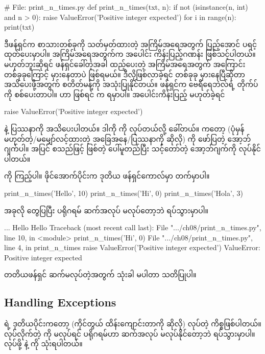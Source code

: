 %
\begin{py}
# File: print_n_times.py
def print_n_times(txt, n):
    if not (isinstance(n, int) and n > 0):
        raise ValueError('Positive integer expected')
    for i in range(n):
        print(txt)
\end{py}
%
ဒီဖန်ရှင်က စာသားတစ်ခုကို သတ်မှတ်ထားတဲ့ အကြိမ်အရေအတွက် ပြည့်အောင် ပရင့်ထုတ်ပေးမှာပါ။ အကြိမ်အရေအတွက်က အပေါင်း ကိန်းပြည့်ဂဏန်း ဖြစ်သင့်ပါတယ်။ မဟုတ်ဘူးဆိုရင် ဖန်ရှင်ခေါ်တဲ့အခါ ထည့်ပေးတဲ့ အကြိမ်အရေအတွက် အကြောင်းတစ်ခုခုကြောင့် မှားနေတာပဲ ဖြစ်ရမယ်။ ဒီလိုဖြစ်လာခဲ့ရင် တစ်ခုခု မှားနေပြီဆိုတာ အသိပေးဖို့အတွက်  စတိတ်မန့်ကို အသုံးပြုနိုင်တယ်။  ဖန်ရှင်က ဗေရီရေဘဲလ်ရဲ့ တိုက်ပ်ကို စစ်ပေးတာပါ။  ဟာ  ဖြစ်ရင်  က  ရမှာပါ။ အပေါင်းကိန်းပြည့် မဟုတ်ခဲ့ရင်
%
\begin{py}
raise ValueError('Positive integer expected')
\end{py}
%
နဲ့ ပြဿနာကို အသိပေးပါတယ်။ ဒါကို  ကို  လုပ်တယ်လို့ ခေါ်တယ်။  ကတော့  (ပုံမှန်မဟုတ်တဲ့/မမျှော်လင့်ထားတဲ့ အခြေအနေ/ပြဿနာကို ဆိုလို) ကို ဖော်ပြတဲ့ အော့ဘ်ဂျက်ပါ။  အပြင် \fEn{,}  စသည်ဖြင့် ဖြစ်တဲ့  ပေါ်မူတည်ပြီး သင့်တော်တဲ့ အော့ဘ်ဂျက်ကို  လုပ်နိုင်ပါတယ်။ 

 ကို  ကြည့်ပါ။ ဖိုင်အောက်ပိုင်းက ဒုတိယ ဖန်ရှင်ကောလ်မှာ  တက်မှာပါ။
%
\begin{py}
print_n_times('Hello', 10)
print_n_times('Hi', 0)
print_n_times('Hola', 3)
\end{py}
%
အခုလို  တွေပြပြီး ပရိုဂရမ် ဆက်အလုပ် မလုပ်တော့ဘဲ ရပ်သွားမှာပါ။ 
\begin{codetxt}
...
Hello
Hello
Traceback (most recent call last):
  File ".../ch08/print_n_times.py", line 10, in <module>
    print_n_times('Hi', 0)
  File ".../ch08/print_n_times.py", line 4, in print_n_times
    raise ValueError('Positive integer expected')
ValueError: Positive integer expected
\end{codetxt}
တတိယဖန်ရှင် ဆက်မလုပ်တဲ့အတွက်  သုံးခါ မပါတာ သတိပြုပါ။ 

\subsection*{Handling Exceptions}
 ရဲ့ ဒုတိယပိုင်းကတော့  (ကိုင်တွယ် ထိန်းကျောင်းတာကို ဆိုလို) လုပ်တဲ့ ကိစ္စဖြစ်ပါတယ်။
 လုပ်လိုက်တဲ့  ကို  မလုပ်ရင် ပရိုဂရမ်ဟာ ဆက်အလုပ် မလုပ်နိုင်တော့ဘဲ ရပ်သွားမှာပါ။  လုပ်ဖို့  နဲ့  ကို သုံးရပါတယ်။


